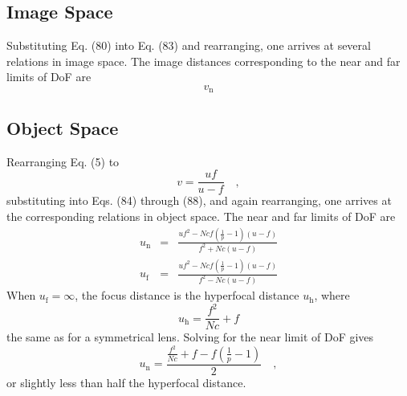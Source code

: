 \documentclass[11pt, oneside]{scrartcl}   	%
\begin{document}
\subsection{Image Space}

Substituting Eq. (80) into Eq. (83) and rearranging, one arrives at several relations in image space. The image distances corresponding to the near and far limits of DoF are
\begin{equation}
v_\mathrm{n} 
\end{equation}


\subsection{Object Space}

Rearranging Eq. (5) to
\begin{equation}
  \label{eq:5v}
  v = \frac{uf}{u-f}\quad,
\end{equation}
%
substituting into Eqs. (84) through (88), and again rearranging, one
arrives at the corresponding relations in object space. The near and
far limits of DoF are
\begin{eqnarray}
     u_\mathrm{n} & = & \frac{uf^2-N\!cf\left(\frac1p-1\right)(u-f)}{f^2 + N\!c(u-f)}\label{eq:89}\\
     u_\mathrm{f} & = & \frac{uf^2-N\!cf\left(\frac1p-1\right)(u-f)}{f^2 - N\!c(u-f)}\label{eq:90}
\end{eqnarray}
When $u_\mathrm{f} = \infty$, the focus distance is the hyperfocal distance
$u_\mathrm{h}$, where
\begin{equation}
  \label{eq:uh2}
  u_\mathrm{h} = \frac{f^2}{N\!c} + f
\end{equation}
the same as for a symmetrical lens. Solving for the near limit of DoF
gives
\begin{equation}
  \label{eq:3un}
  u_\mathrm{n} = \frac{\frac{f^2}{N\!c} + f - f\left(\frac1p-1\right)}2\quad,
\end{equation}
or slightly less than half the hyperfocal distance.
\end{document}
